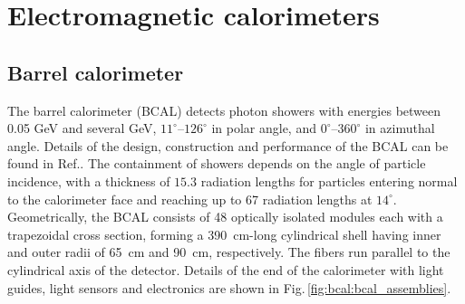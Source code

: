 \section[Electromagnetic calorimeters (Elton/Colin)] {Electromagnetic calorimeters \label{sec:calorimeters}}
\subsection[Barrel calorimeter ]{Barrel calorimeter \label{sec:bcal}}
The barrel calorimeter (BCAL) detects photon showers with energies between 0.05 GeV and several GeV, $11^{\circ}$--$126^{\circ}$ in polar angle, and $0^{\circ}$--$360^{\circ}$ in azimuthal angle. Details of the design, construction and performance of the BCAL can be found in Ref.\cite{BEATTIE201824}. The containment of showers depends on the angle of particle incidence, with a thickness of $15.3$ radiation lengths for particles entering normal to the calorimeter face and reaching up to 67 radiation lengths at $14^{\circ}$. Geometrically, the BCAL consists of 48 optically isolated modules each with a trapezoidal cross section, forming a  390~cm-long cylindrical shell having inner and outer radii of 65~cm and 90~cm, respectively. The fibers run parallel to the cylindrical axis of the detector.  Details of the end of the calorimeter with light guides, light sensors and electronics are shown in  Fig.\,\ref{fig:bcal:bcal_assemblies}.

